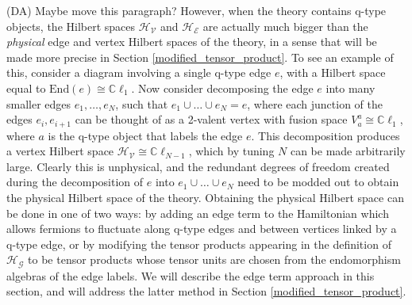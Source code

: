 \documentclass[12pt,a4paper]{article}
\newcommand{\mce}{\mathcal{E}}
\newcommand{\mcg}{\mathcal{G}}
\newcommand{\mch}{\mathcal{H}}
\newcommand{\mcv}{\mathcal{V}}
\newcommand{\End}{\text{End}}
\newcommand{\cl}{\mathbb{C}\ell}
\newcommand{\dave}[1]{{\color{ao(english)}\footnotesize{(DA) #1}}}
\begin{document}
\dave{Maybe move this paragraph?}
However, when the theory contains q-type objects, the Hilbert spaces $\mch_\mcv$ and $\mch_\mce$ are actually much bigger than the {\it physical} edge and vertex Hilbert spaces of the theory, in a sense that will be made more precise in Section \ref{modified_tensor_product}. 
To see an example of this, consider a diagram involving a single q-type edge $e$, with a Hilbert space equal to $\End(e) \cong \cl_1$. 
Now consider decomposing the edge $e$ into many smaller edges $e_1,\dots,e_N$, such that $e_1\cup\dots\cup e_N = e$, where each junction of the edges $e_i,e_{i+1}$ can be thought of as a 2-valent vertex with fusion space $V_a^a \cong \cl_1$, where $a$ is the q-type object that labels the edge $e$. 
This decomposition produces a vertex Hilbert space $\mch_\mcv \cong \cl_{N-1}$, which by tuning $N$ can be made arbitrarily large. 
Clearly this is unphysical, and the redundant degrees of freedom created during the decomposition of $e$ into $e_1\cup\dots\cup e_N$ need to be modded out to obtain the physical Hilbert space of the theory. 
Obtaining the physical Hilbert space can be done in one of two ways: by adding an edge term to the Hamiltonian which allows fermions to fluctuate along q-type edges and between vertices linked by a q-type edge, or by modifying the tensor products appearing in the definition of $\mch_\mcg$ to be tensor products whose tensor units are chosen from the endomorphism algebras of the edge labels. 
We will describe the edge term approach in this section, and will address the latter method in Section \ref{modified_tensor_product}. 

 
 



 
\end{document}
